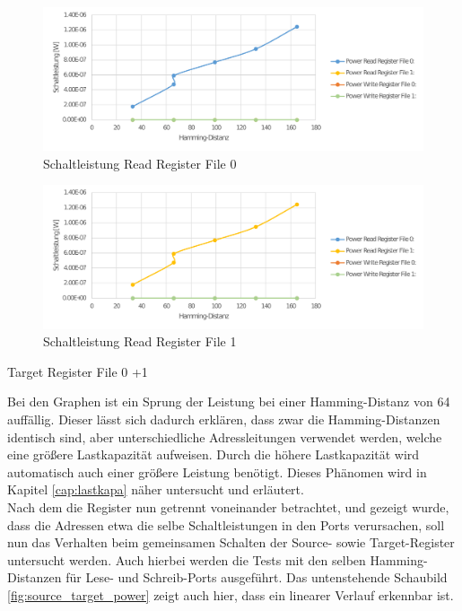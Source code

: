 \begin{figure}[H]
	\centering
	\includegraphics[width=\textwidth]{fig/source1_power.pdf}
	\caption{Schaltleistung Read Register File 0}
	\label{fig:source1_power}
\end{figure}
\begin{figure}[H]
	\centering
	\includegraphics[width=\textwidth]{fig/source2_power.pdf}
	\caption{Schaltleistung Read Register File 1}
	\label{fig:source1_power}
\end{figure}

Target Register File 0 +1

Bei den Graphen ist ein Sprung der Leistung bei einer Hamming-Distanz von 64 auffällig. Dieser lässt sich dadurch erklären, dass zwar die Hamming-Distanzen identisch sind, aber unterschiedliche Adressleitungen verwendet werden, welche eine größere Lastkapazität aufweisen. Durch die höhere Lastkapazität wird automatisch auch einer größere Leistung benötigt. Dieses Phänomen wird in Kapitel \ref{cap:lastkapa} näher untersucht und erläutert.\\

Nach dem die Register nun getrennt voneinander betrachtet, und gezeigt wurde, dass die Adressen etwa die selbe Schaltleistungen in den Ports verursachen, soll nun das Verhalten beim gemeinsamen Schalten der Source- sowie Target-Register untersucht werden. Auch hierbei werden die Tests mit den selben Hamming-Distanzen für Lese- und Schreib-Ports ausgeführt. Das untenstehende Schaubild \ref{fig:source_target_power} zeigt auch hier, dass ein linearer Verlauf erkennbar ist.


